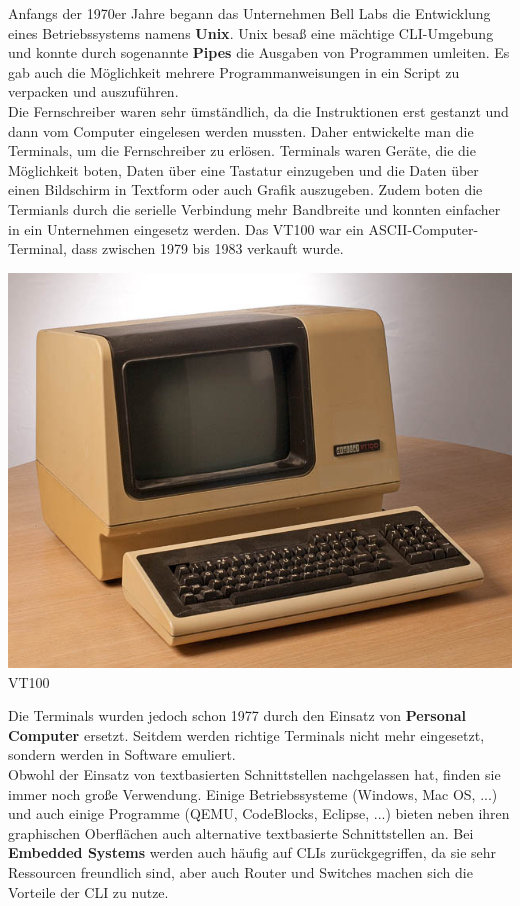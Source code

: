 \documentclass[12pt,a4paper]{report}
\begin{document}
\begin{onehalfspace}
Anfangs der 1970er Jahre begann das Unternehmen Bell Labs die Entwicklung eines Betriebssystems namens \textbf{Unix}. Unix besaß eine mächtige CLI-Umgebung und konnte durch sogenannte \textbf{Pipes} die Ausgaben von Programmen umleiten. Es gab auch die Möglichkeit mehrere Programmanweisungen in ein Script zu verpacken und auszuführen. \\

Die Fernschreiber waren sehr ümständlich, da die Instruktionen erst gestanzt und dann vom Computer eingelesen werden mussten. Daher entwickelte man die Terminals, um die Fernschreiber zu erlösen. Terminals waren Geräte, die die Möglichkeit boten, Daten über eine Tastatur einzugeben und die Daten über einen Bildschirm in Textform oder auch Grafik auszugeben. Zudem boten die Termianls durch die serielle Verbindung mehr Bandbreite und konnten einfacher in ein Unternehmen eingesetz werden. Das VT100 war ein ASCII-Computer-Terminal, dass zwischen 1979 bis 1983 verkauft wurde.\\

\begin{center}
\includegraphics[scale=2.0]{img/vt100.jpg}\\
VT100 \cite{wiki09}
\end{center}

Die Terminals wurden jedoch schon 1977 durch den Einsatz von \textbf{Personal Computer} ersetzt. Seitdem werden richtige Terminals nicht mehr eingesetzt, sondern werden in Software emuliert. \cite{wiki09}\\

Obwohl der Einsatz von textbasierten Schnittstellen nachgelassen hat, finden sie immer noch große Verwendung. Einige Betriebssysteme (Windows, Mac OS, ...) und auch einige Programme (QEMU, CodeBlocks, Eclipse, ...) bieten neben ihren graphischen Oberflächen auch alternative textbasierte Schnittstellen an. Bei \textbf{Embedded Systems} werden auch häufig auf CLIs zurückgegriffen, da sie sehr Ressourcen freundlich sind, aber auch Router und Switches machen sich die Vorteile der CLI zu nutze. \cite{wiki06}


\end{onehalfspace}
\end{document}

